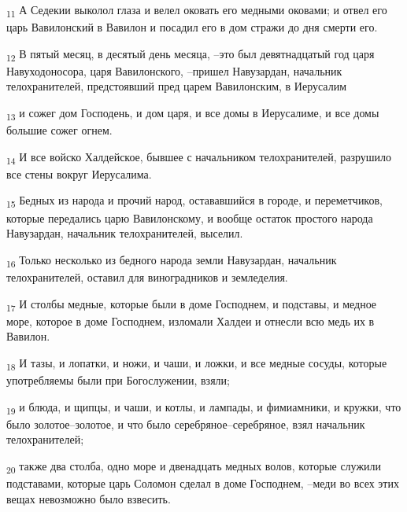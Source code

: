 \begin{tcolorbox}
\textsubscript{11} А Седекии выколол глаза и велел оковать его медными оковами; и отвел его царь Вавилонский в Вавилон и посадил его в дом стражи до дня смерти его.
\end{tcolorbox}
\begin{tcolorbox}
\textsubscript{12} В пятый месяц, в десятый день месяца, --это был девятнадцатый год царя Навуходоносора, царя Вавилонского, --пришел Навузардан, начальник телохранителей, предстоявший пред царем Вавилонским, в Иерусалим
\end{tcolorbox}
\begin{tcolorbox}
\textsubscript{13} и сожег дом Господень, и дом царя, и все домы в Иерусалиме, и все домы большие сожег огнем.
\end{tcolorbox}
\begin{tcolorbox}
\textsubscript{14} И все войско Халдейское, бывшее с начальником телохранителей, разрушило все стены вокруг Иерусалима.
\end{tcolorbox}
\begin{tcolorbox}
\textsubscript{15} Бедных из народа и прочий народ, остававшийся в городе, и переметчиков, которые передались царю Вавилонскому, и вообще остаток простого народа Навузардан, начальник телохранителей, выселил.
\end{tcolorbox}
\begin{tcolorbox}
\textsubscript{16} Только несколько из бедного народа земли Навузардан, начальник телохранителей, оставил для виноградников и земледелия.
\end{tcolorbox}
\begin{tcolorbox}
\textsubscript{17} И столбы медные, которые были в доме Господнем, и подставы, и медное море, которое в доме Господнем, изломали Халдеи и отнесли всю медь их в Вавилон.
\end{tcolorbox}
\begin{tcolorbox}
\textsubscript{18} И тазы, и лопатки, и ножи, и чаши, и ложки, и все медные сосуды, которые употребляемы были при Богослужении, взяли;
\end{tcolorbox}
\begin{tcolorbox}
\textsubscript{19} и блюда, и щипцы, и чаши, и котлы, и лампады, и фимиамники, и кружки, что было золотое--золотое, и что было серебряное--серебряное, взял начальник телохранителей;
\end{tcolorbox}
\begin{tcolorbox}
\textsubscript{20} также два столба, одно море и двенадцать медных волов, которые служили подставами, которые царь Соломон сделал в доме Господнем, --меди во всех этих вещах невозможно было взвесить.
\end{tcolorbox}
